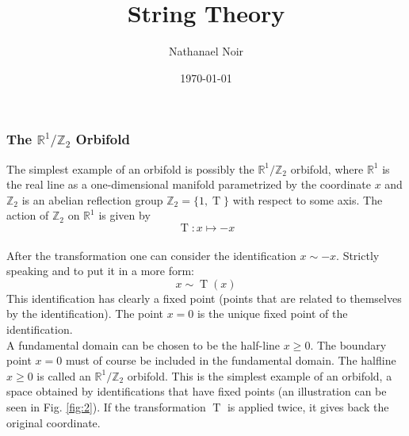 \documentclass[11pt, xcolor=dvipsnames]{beamer}
\title{String Theory} %
\author{Nathanael Noir} %
\institute[University of Vienna] %
{
University of Vienna\\ %
\medskip
\textit{john@smith.com} %
}
\date{\today} %
\begin{document}
\begin{frame}
\titlepage %
\end{frame}
\begin{frame}
\frametitle{The \(\mathbb{R}^{1}/ \mathbb{Z}_{2}\) Orbifold}
The simplest example of an orbifold is possibly the \alert{\(\mathbb{R}^{1}/\mathbb{Z}_{2}\)} orbifold, where \(\mathbb{R}^{1}\) is the real line as a one-dimensional manifold parametrized by the coordinate \(x\) and \(\mathbb{Z}_{2}\) is an abelian reflection group \(\mathbb{Z}_{2}=\{1,\operatorname{T}\}\) with respect to some axis. The action of \(\mathbb{Z}_{2}\) on \(\mathbb{R}^{1}\) is given by \\
\begin{equation}
	\operatorname{T}: x \mapsto -x 
\end{equation}\\
 After the transformation one can  consider the identification \(x\sim-x\). Strictly speaking and to put it in a more  form:
 \begin{equation}
 	x\sim \operatorname{T}(x)
 \end{equation}
  This identification has clearly a fixed point (points that are related to themselves by the identification). The point \(x = 0\) is the unique fixed point of the identification.\\ A fundamental domain can be chosen to be the half-line \(x \geq 0\). The boundary point \(x = 0\) must of course be included in the fundamental domain. The halfline \(x \geq 0\) is called an \(\mathbb{R}^{1}/\mathbb{Z}_{2}\) orbifold. This is the simplest example of an orbifold, a space obtained by identifications that have fixed points (an illustration can be seen in Fig. \ref{fig:2}). If the transformation \(\operatorname{T}\) is applied twice, it gives back the original coordinate.\\\\

\begin{figure}[!h]
\end{figure}
\end{frame}
\end{document}
